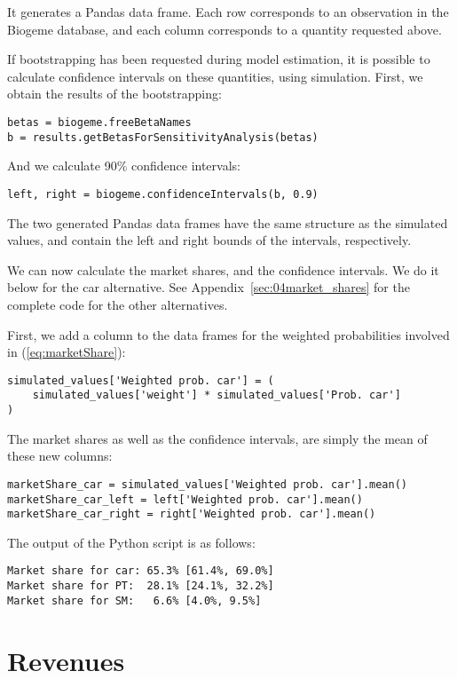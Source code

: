 \documentclass[12pt,a4paper]{article}
\newcommand{\req}[1]{(\ref{#1})}
\begin{document}
It generates a Pandas data frame. Each row corresponds to an observation
in the Biogeme database, and each column corresponds to a quantity
requested above.

If bootstrapping has been requested during model estimation, 
it is possible to calculate confidence intervals on these
  quantities, using simulation. First, we obtain the results of the
  bootstrapping: 
\begin{lstlisting}
betas = biogeme.freeBetaNames
b = results.getBetasForSensitivityAnalysis(betas)
\end{lstlisting}
And we calculate 90\% confidence intervals:
\begin{lstlisting}
left, right = biogeme.confidenceIntervals(b, 0.9)
\end{lstlisting}
The two generated Pandas data frames have the same structure as the simulated
values, and contain the left and right bounds of the intervals,
respectively.

We can now calculate the market shares, and the confidence
  intervals. We do it below for the car alternative. See
  Appendix~\ref{sec:04market_shares} for the complete code for the
  other alternatives.

  First, we add a column to the data frames for the
  weighted probabilities
  involved in \req{eq:marketShare}:
\begin{lstlisting}
simulated_values['Weighted prob. car'] = (
    simulated_values['weight'] * simulated_values['Prob. car']
)
\end{lstlisting}
 The market shares as well as the confidence intervals,  are simply
 the mean of these new columns:
\begin{lstlisting}
marketShare_car = simulated_values['Weighted prob. car'].mean()
marketShare_car_left = left['Weighted prob. car'].mean()
marketShare_car_right = right['Weighted prob. car'].mean()
\end{lstlisting}

The output of the Python script is as follows:

\begin{lstlisting}
Market share for car: 65.3% [61.4%, 69.0%]
Market share for PT:  28.1% [24.1%, 32.2%]
Market share for SM:   6.6% [4.0%, 9.5%]
\end{lstlisting}

\section{Revenues}
\end{document}
